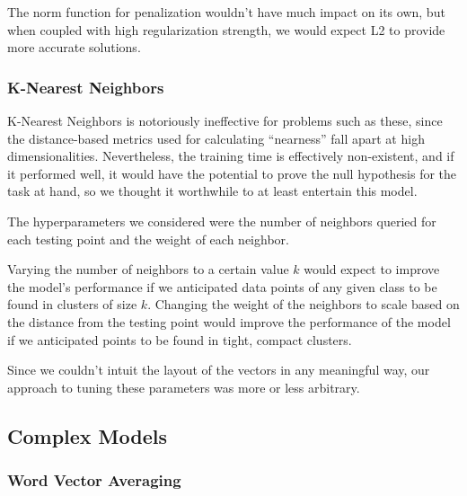 \documentclass[conference]{IEEEtran}
\begin{document}
The norm function for penalization wouldn't have much impact on its own, but when coupled with high regularization strength, we would expect L2 to provide more accurate solutions.

\subsubsection{K-Nearest Neighbors}

K-Nearest Neighbors is notoriously ineffective for problems such as these, since the distance-based metrics used for calculating ``nearness'' fall apart at high dimensionalities. Nevertheless, the training time is effectively non-existent, and if it performed well, it would have the potential to prove the null hypothesis for the task at hand, so we thought it worthwhile to at least entertain this model.

The hyperparameters we considered were the number of neighbors queried for each testing point and the weight of each neighbor. 

Varying the number of neighbors to a certain value $k$ would expect to improve the model's performance if we anticipated data points of any given class to be found in clusters of size $k$. Changing the weight of the neighbors to scale based on the distance from the testing point would improve the performance of the model if we anticipated points to be found in tight, compact clusters.

Since we couldn't intuit the layout of the vectors in any meaningful way, our approach to tuning these parameters was more or less arbitrary.

\subsection{Complex Models}


\subsubsection{Word Vector Averaging}
 
\end{document}
